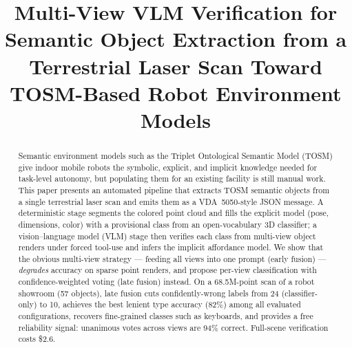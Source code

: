\documentclass[conference]{IEEEtran}
\begin{document}
\title{Multi-View VLM Verification for Semantic Object Extraction from a
Terrestrial Laser Scan Toward TOSM-Based Robot Environment Models}

\author{
\and
{}
}

\maketitle

\begin{abstract}
Semantic environment models such as the Triplet Ontological Semantic Model
(TOSM) give indoor mobile robots the symbolic, explicit, and implicit
knowledge needed for task-level autonomy, but populating them for an
existing facility is still manual work. This paper presents an automated
pipeline that extracts TOSM semantic objects from a single terrestrial
laser scan and emits them as a VDA~5050-style JSON message. A deterministic
stage segments the colored point cloud and fills the explicit model (pose,
dimensions, color) with a provisional class from an open-vocabulary 3D
classifier; a vision--language model (VLM) stage then verifies each class
from multi-view object renders under forced tool-use and infers the
implicit affordance model. We show that the obvious multi-view strategy ---
feeding all views into one prompt (early fusion) --- \emph{degrades}
accuracy on sparse point renders, and propose per-view classification with
confidence-weighted voting (late fusion) instead. On a 68.5M-point scan of
a robot showroom (57 objects), late fusion cuts confidently-wrong labels
from 24 (classifier-only) to 10, achieves the best lenient type accuracy
(82\%) among all evaluated configurations, recovers fine-grained classes
such as keyboards, and provides a free reliability signal: unanimous votes
across views are 94\% correct. Full-scene verification costs
\$2.6.
\end{abstract}
\end{document}
